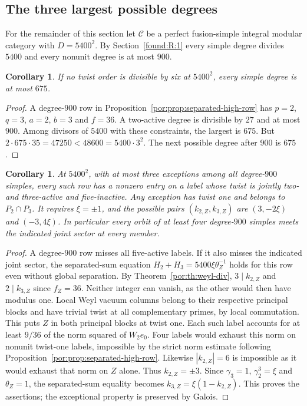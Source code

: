 \documentclass[11pt,a4paper]{article}
\numberwithin{equation}{section}
\newtheorem{corollary}[theorem]{Corollary}
\theoremstyle{remark}
\begin{document}
\subsection{The three largest possible degrees}\label{found:T:2}\label{found:T:key:sec:large}
For the remainder of this section let $\mathcal C$ be a perfect fusion-simple integral modular category with $D=5400^2$. By Section~\ref{found:R:1} every simple degree divides $5400$ and every nonunit degree is at most $900$.
\begin{corollary}\label{por:prop:small-ninehundred}
If no twist order is divisible by six at $5400^2$, every simple degree is at most $675$.
\end{corollary}
\begin{proof}
A degree-$900$ row in Proposition~\ref{por:prop:separated-high-row} has $p=2$, $q=3$, $a=2$, $b=3$ and $f=36$. A two-active degree is divisible by $27$ and at most $900$. Among divisors of $5400$ with these constraints, the largest is $675$. But $2\cdot675\cdot35=47250<48600=5400\cdot3^2$. The next possible degree after $900$ is $675$.
\end{proof}

\begin{corollary}\label{por:th:joint-at-ninehundred}
At $5400^2$, with at most three exceptions among all degree-$900$ simples, every such row has a nonzero entry on a label whose twist is jointly two- and three-active and five-inactive. Any exception has twist one and belongs to $P_2\cap P_3$. It requires $\xi=\pm1$, and the possible pairs $(k_{2,Z},k_{3,Z})$ are $(3,-2\xi)$ and $(-3,4\xi)$. In particular every orbit of at least four degree-$900$ simples meets the indicated joint sector at every member.
\end{corollary}
\begin{proof}
A degree-$900$ row misses all five-active labels. If it also misses the indicated joint sector, the separated-sum equation $H_2+H_3=5400\xi\theta_Z^{-1}$ holds for this row even without global separation. By Theorem~\ref{por:th:weyl-div}, $3\mid k_{2,Z}$ and $2\mid k_{3,Z}$ since $f_Z=36$. Neither integer can vanish, as the other would then have modulus one. Local Weyl vacuum columns belong to their respective principal blocks and have trivial twist at all complementary primes, by local commutation. This puts $Z$ in both principal blocks at twist one. Each such label accounts for at least $9/36$ of the norm squared of $W_2e_0$. Four labels would exhaust this norm on nonunit twist-one labels, impossible by the strict norm estimate following Proposition~\ref{por:prop:separated-high-row}. Likewise $|k_{2,Z}|=6$ is impossible as it would exhaust that norm on $Z$ alone. Thus $k_{2,Z}=\pm3$. Since $\gamma_3=1$, $\gamma_2^3=\xi$ and $\theta_Z=1$, the separated-sum equality becomes $k_{3,Z}=\xi(1-k_{2,Z})$. This proves the assertions; the exceptional property is preserved by Galois.
\end{proof}
\end{document}
